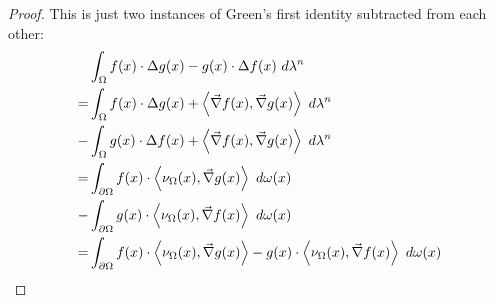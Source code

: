 \begin{proof}
	This is just two instances of Green's first identity subtracted from each other:
	\begin{align*}
		&\int_\Omega f(x) \cdot  \Delta g(x) - g(x) \cdot \Delta f(x) ~d\lambda^n\\ 
		=
		&\int_\Omega f(x) \cdot  \Delta g(x) + \left\langle \vec{\nabla} f(x), \vec{\nabla} g(x) \right\rangle ~d\lambda^n\\ 
		-
		&\int_\Omega g(x) \cdot \Delta f(x) + \left\langle \vec{\nabla} f(x), \vec{\nabla} g(x) \right\rangle ~d\lambda^n\\
		=
		&\int_{\partial \Omega} f(x) \cdot \left\langle \nu_\Omega(x), \vec{\nabla} g(x) \right\rangle ~d\omega(x) \\
		-
		&\int_{\partial \Omega} g(x) \cdot \left\langle \nu_\Omega(x), \vec{\nabla} f(x) \right\rangle ~d\omega(x) \\
		=
		&\int_{\partial \Omega} f(x) \cdot \left\langle \nu_\Omega(x), \vec{\nabla} g(x) \right\rangle
		-
		g(x)
		\cdot
		\left\langle \nu_\Omega(x), \vec{\nabla} f(x) \right\rangle
		~d\omega(x)
	\end{align*}
\end{proof}
